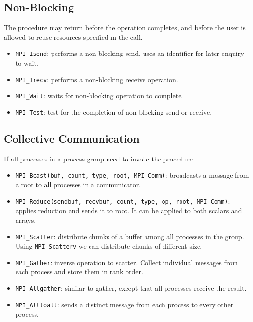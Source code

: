 \subsection*{Non-Blocking}
The procedure may return before the operation completes, and before the user is allowed to reuse resources specified in the call.
\begin{itemize}
    \item \texttt{MPI\_Isend}: performs a non-blocking send, uses an identifier for later enquiry to wait.
    \item \texttt{MPI\_Irecv}: performs a non-blocking receive operation.
    \item \texttt{MPI\_Wait}: waits for non-blocking operation to complete.
    \item \texttt{MPI\_Test}: test for the completion of non-blocking send or receive.
\end{itemize}

\subsection{Collective Communication}
If all processes in a process group need to invoke the procedure.
\begin{itemize}
    \item \texttt{MPI\_Bcast(buf, count, type, root, MPI\_Comm)}: broadcasts a message from a root to all processes in a communicator.
    \item \texttt{MPI\_Reduce(sendbuf, recvbuf, count, type, op, root, MPI\_Comm)}: applies reduction and sends it to root.
        It can be applied to both scalars and arrays.
    \item \texttt{MPI\_Scatter}: distribute chunks of a buffer among all processes in the group.
        Using \texttt{MPI\_Scatterv} we can distribute chunks of different size.
    \item \texttt{MPI\_Gather}: inverse operation to scatter.
        Collect individual messages from each process and store them in rank order.
    \item \texttt{MPI\_Allgather}: similar to gather, except that all processes receive the result.
    \item \texttt{MPI\_Alltoall}: sends a distinct message from each process to every other process.
\end{itemize}
